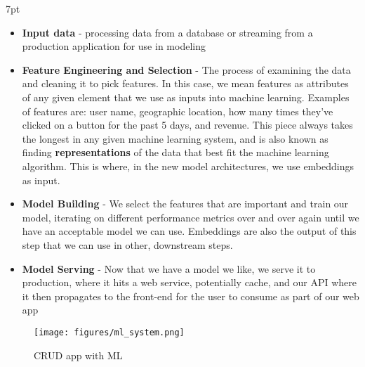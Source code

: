 \documentclass[11pt, table]{diazessay} %
\newenvironment{formal}{%
  \def\FrameCommand{%
	\hspace{1pt}%
	{\color{w_lightblue}\vrule width 2pt}%
	{\color{formalshade}\vrule width 4pt}%
	\colorbox{formalshade}%
  }%
  \MakeFramed{\advance\hsize-\width\FrameRestore}%
  \noindent\hspace{-4.55pt}%
  \begin{adjustwidth}{}{7pt}%
  \vspace{2pt}\vspace{2pt}%
}
{%
  \vspace{2pt}\end{adjustwidth}\endMakeFramed%
}
\begin{document}
\begin{sloppypar}
\begin{formal}
\begin{itemize}
  \item \textbf{Input data} - processing data from a database or streaming from a production application for use in modeling
  \item \textbf{Feature Engineering and Selection} - The process of examining the data and cleaning it to pick features. In this case, we mean features as attributes of any given element that we use as inputs into machine learning. Examples of features are: user name, geographic location, how many times they've clicked on a button for the past 5 days, and revenue. This piece always takes the longest in any given machine learning system, and is also known as finding \textbf{representations} \citep{bengio2013representation} of the data that best fit the machine learning algorithm. This is where, in the new model architectures, we use embeddings as input.
  \item \textbf{Model Building} - We select the features that are important and train our model, iterating on different performance metrics over and over again until we have an acceptable model we can use. Embeddings are also the output of this step that we can use in other, downstream steps.
  \item \textbf{Model Serving} - Now that we have a model we like, we serve it to production, where it hits a web service, potentially cache, and our API where it then propagates to the front-end for the user to consume as part of our web app
\end{itemize}
\end{formal}

\begin{figure}[H]
\centering
\texttt{[image: figures/ml\_system.png]}
\caption{CRUD app with ML}
\end{figure}


\end{sloppypar}
\end{document}
